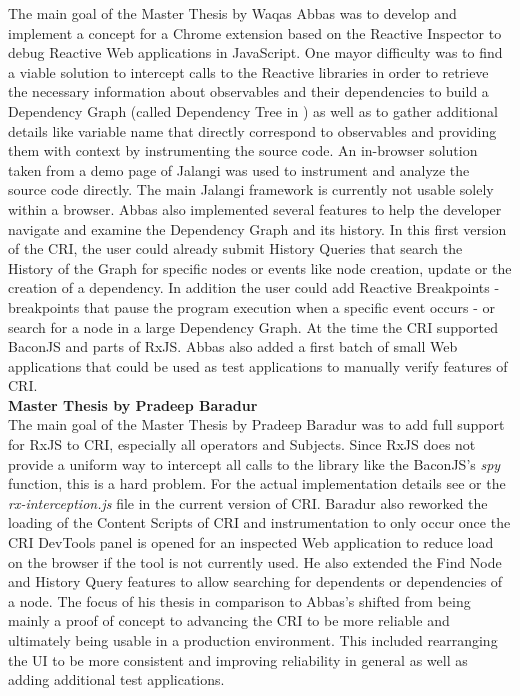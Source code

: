 	\cite{ThesisAbbas} The main goal of the Master Thesis by Waqas Abbas was to develop and implement a concept for a Chrome extension based on the Reactive Inspector to debug Reactive Web applications in JavaScript.
	One mayor difficulty was to find a viable solution to intercept calls to the Reactive libraries in order to retrieve the necessary information about observables and their dependencies to build a Dependency Graph (called Dependency Tree in \cite{ReactiveInspector}) as well as to gather additional details like variable name that directly correspond to observables and providing them with context by instrumenting the source code. An in-browser solution taken from a demo page \cite{JalangiDemo} of Jalangi was used to instrument and analyze the source code directly. The main Jalangi framework \cite{Jalangi} is currently not usable solely within a browser.
	Abbas also implemented several features to help the developer navigate and examine the Dependency Graph and its history. In this first version of the CRI, the user could already submit History Queries that search the History of the Graph for specific nodes or events like node creation, update or the creation of a dependency. In addition the user could add Reactive Breakpoints - breakpoints that pause the program execution when a specific event occurs - or search for a node in a large Dependency Graph.
	At the time the CRI supported BaconJS\cite{BaconJS} and parts of RxJS\cite{RxJS}. Abbas also added a first batch of small Web applications that could be used as test applications to manually verify features of CRI.\\		
		
	\textbf{Master Thesis by Pradeep Baradur}\\
	
	 \cite{ThesisBaradur} The main goal of the Master Thesis by Pradeep Baradur was to add full support for RxJS to CRI, especially all operators and Subjects. Since RxJS does not provide a uniform way to intercept all calls to the library like the BaconJS's \emph{spy} function, this is a hard problem. For the actual implementation details see \cite{ThesisBaradur} or the \emph{rx-interception.js} file in the current version of CRI. Baradur also reworked the loading of the Content Scripts of CRI and instrumentation to only occur once the CRI DevTools panel is opened for an inspected Web application to reduce load on the browser if the tool is not currently used. He also extended the Find Node and History Query features to allow searching for dependents or dependencies of a node. The focus of his thesis in comparison to Abbas's shifted from being mainly a proof of concept to advancing the CRI to be more reliable and ultimately being usable in a production environment. This included rearranging the UI to be more consistent and improving reliability in general as well as adding additional test applications.\\		
		
